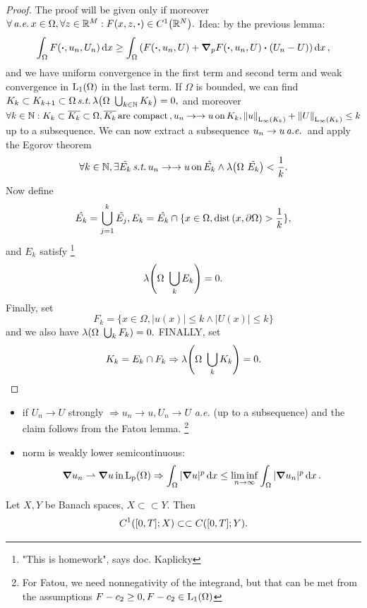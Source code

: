 \documentclass{article}
\begin{document}
\begin{proof}
	The proof will be given only if moreover $\forall \, \text{\textit{a.e.}} \,x \in \Omega, \forall z \in \R^{M}: F\qty(x,z,\vdot) \in C^1\qty(\R^N).$ Idea: by the previous lemma:
	\[
		\int_{\Omega}F\qty(\vdot, u_n, U_n)\dd{x} \geq \int_{\Omega}\qty(F\qty(\vdot, u_n, U) + \grad_p F\qty(\vdot, u_n, U)\vdot\qty(U_n - U))\dd{x},
	\]
	and we have uniform convergence in the first term and second term and weak convergence in $\LpSet[1]{\Omega}$ in the last term. If $\Omega$ is bounded, we can find $K_k \subset K_{k+1} \subset \Omega \, \text{\textit{s.t.}} \, \lambda\qty(\Omega \ \bigcup_{k \in \N}K_k) = 0,$ and moreover $ \forall k \in {\mathbb N}: K_k \subset \overline{K_k} \subset \Omega, \overline{K_k} \, \text{are compact} \,, u_n \to \to u \, \text{on} \,K_k, \norm{u}_{\text{L}_{\infty}\!\,\left(K_k \right)}+\norm{U}_{\text{L}_{\infty}\!\,\left(K_k \right)}\leq k$ up to a subsequence. We can now extract a subsequence $u_n \to u \, \text{\textit{a.e.}} \,$ and apply the Egorov theorem
	\[
		\forall k \in {\mathbb N}, \exists \tilde{E_k} \, \text{\textit{s.t.}} \, u_n \to \to u \, \text{on} \, \tilde{E_k}\wedge \lambda\qty(\Omega \ \tilde{E_k})< \frac{1}{k}.
	\]
	Now define
	\[
		\hat{E_k} = \bigcup_{j=1}^k \tilde{E_j}, E_k = \hat{E_k} \cap \{ x \in \Omega, \operatorname{dist}\qty(x,\partial \Omega) > \frac{1}{k}\},
	\]
	and $E_k$ satisfy \footnote{"This is homework", says doc. Kaplicky}
	\[
		\lambda\qty(\Omega \ \bigcup_{k}E_k) = 0.
	\]
	Finally, set
	\[
		F_k = \{x \in \Omega, |u(x)| \leq k \wedge |U(x)| \leq k\}
	\]
	and we also have $\lambda\qty(\Omega \ \bigcup_{k}F_k) = 0.$ FINALLY, set
	\[
		K_k = E_k \cap F_k \Rightarrow \lambda\qty(\Omega \ \bigcup_{k}K_k)=0.
	\]
\end{proof}
\begin{remark}
	\begin{itemize}
		\item if $U_n \to U$ strongly $\Rightarrow u_n \to u, U_n \to U$ \textit{a.e.} (up to a subsequence) and the claim follows from the Fatou lemma. \footnote{For Fatou, we need nonnegativity of the integrand, but that can be met from the assumptions $F-c_2 \geq 0, F-c_2 \in \LpSet[1]{\Omega}$}
		\item norm is weakly lower semicontinuous:
			\[
				\grad u_n \rightharpoonup \grad u \, \text{in} \, \LpSet{\Omega} \Rightarrow \int_{\Omega}|\grad u|^p\dd{x} \leq \liminf_{n \to \infty} \int_{\Omega}|\grad u_n|^p\dd{x}.
			\]
	\end{itemize}
\end{remark}
\begin{lemma}
	Let $X,Y$ be Banach spaces, $X \subset \subset Y.$ Then
	\[
		C^1\qty([0,T];X) \subset \subset C\qty([0,T];Y).
	\]
\end{lemma}
\end{document}
